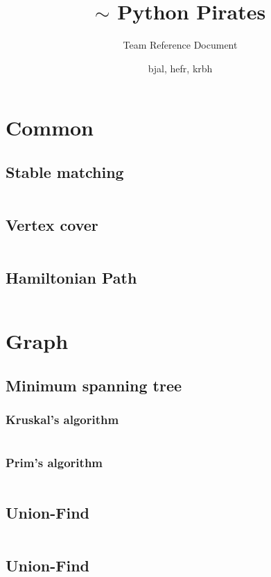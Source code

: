 \documentclass[8pt,a4paper,landscape,oneside]{amsart}
\author{bjal, hefr, krbh}
\title{$\sim$ Python Pirates}
\subtitle{Team Reference Document}
\newcommand{\code}[1]{\inputminted[fontsize=\normalsize,baselinestretch=1]{python}{code/#1}}
\begin{document}
\begin{multicols*}{3}
\maketitle
\thispagestyle{fancy}
\vspace{-3em}
\tableofcontents


\section{Common}

    \subsection{Stable matching}
        \code{helloworld.py}
    \subsection{Vertex cover}
        \code{helloworld.py}
    \subsection{Hamiltonian Path}
        \code{helloworld.py}

\section{Graph}

    \subsection{Minimum spanning tree}
        \subsubsection{Kruskal's algorithm}
            \code{helloworld.py}
        \subsubsection{Prim's algorithm}
            \code{helloworld.py}
    \subsection{Union-Find}
        \code{helloworld.py}
    \subsection{Union-Find}
        \code{helloworld.py}

\end{multicols*}
\end{document}
